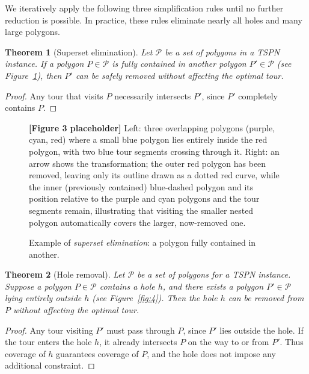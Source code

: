 \documentclass[11pt,a4paper]{article}
\theoremstyle{plain}
\newtheorem{theorem}{Theorem}
\begin{document}
We iteratively apply the following three simplification rules until no further reduction is possible. In practice, these rules eliminate nearly all holes and many large polygons.

\begin{theorem}[Superset elimination]
Let $\mathcal{P}$ be a set of polygons in a TSPN instance. If a polygon $P \in \mathcal{P}$ is fully contained in another polygon $P' \in \mathcal{P}$ (see Figure~\ref{fig:3}), then $P'$ can be safely removed without affecting the optimal tour.
\end{theorem}

\begin{proof}
Any tour that visits $P$ necessarily intersects $P'$, since $P'$ completely contains $P$.
\end{proof}

\begin{figure}[h]
\centering
\begin{figplaceholder}
\textbf{[Figure 3 placeholder]} Left: three overlapping polygons (purple, cyan, red) where a small blue polygon lies entirely inside the red polygon, with two blue tour segments crossing through it. Right: an arrow shows the transformation; the outer red polygon has been removed, leaving only its outline drawn as a dotted red curve, while the inner (previously contained) blue-dashed polygon and its position relative to the purple and cyan polygons and the tour segments remain, illustrating that visiting the smaller nested polygon automatically covers the larger, now-removed one.
\end{figplaceholder}
\caption{Example of \emph{superset elimination}: a polygon fully contained in another.}
\label{fig:3}
\end{figure}

\begin{theorem}[Hole removal]
Let $\mathcal{P}$ be a set of polygons for a TSPN instance. Suppose a polygon $P \in \mathcal{P}$ contains a hole $h$, and there exists a polygon $P' \in \mathcal{P}$ lying entirely outside $h$ (see Figure~\ref{fig:4}). Then the hole $h$ can be removed from $P$ without affecting the optimal tour.
\end{theorem}

\begin{proof}
Any tour visiting $P'$ must pass through $P$, since $P'$ lies outside the hole. If the tour enters the hole $h$, it already intersects $P$ on the way to or from $P'$. Thus coverage of $h$ guarantees coverage of $P$, and the hole does not impose any additional constraint.
\end{proof}
\end{document}
